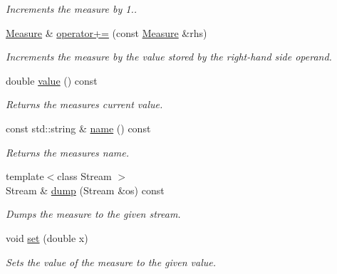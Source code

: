 \begin{DoxyCompactItemize}
\begin{DoxyCompactList}\small\item\em Increments the measure by 1.. \end{DoxyCompactList}\item 
\hyperlink{structslb_1_1core_1_1util_1_1Measure}{Measure} \& \hyperlink{structslb_1_1core_1_1util_1_1Measure_a49b1df4022eaacb4826ace6305deb4f6}{operator+=} (const \hyperlink{structslb_1_1core_1_1util_1_1Measure}{Measure} \&rhs)
\begin{DoxyCompactList}\small\item\em Increments the measure by the value stored by the right-\/hand side operand. \end{DoxyCompactList}\item 
double \hyperlink{structslb_1_1core_1_1util_1_1Measure_ab5a2af483f4db4c7216a182289a726e6}{value} () const 
\begin{DoxyCompactList}\small\item\em Returns the measure\textquotesingle{}s current value. \end{DoxyCompactList}\item 
const std\+::string \& \hyperlink{structslb_1_1core_1_1util_1_1Measure_a7c69142995618fd8fe8a2e46d9763746}{name} () const 
\begin{DoxyCompactList}\small\item\em Returns the measure\textquotesingle{}s name. \end{DoxyCompactList}\item 
{\footnotesize template$<$class Stream $>$ }\\Stream \& \hyperlink{structslb_1_1core_1_1util_1_1Measure_a4e8d969f285d05d330707109db7dcde4}{dump} (Stream \&os) const 
\begin{DoxyCompactList}\small\item\em Dumps the measure to the given stream. \end{DoxyCompactList}\item 
void \hyperlink{structslb_1_1core_1_1util_1_1Measure_a5655a29db1ea2420c1747a48f901abb8}{set} (double x)
\begin{DoxyCompactList}\small\item\em Sets the value of the measure to the given value. \end{DoxyCompactList}\end{DoxyCompactItemize}
